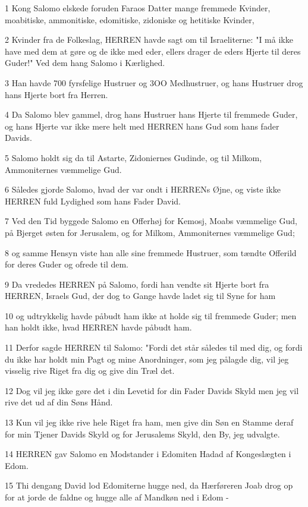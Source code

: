 \par 1 Kong Salomo elskede foruden Faraos Datter mange fremmede Kvinder, moabitiske, ammonitiske, edomitiske, zidoniske og hetitiske Kvinder,
\par 2 Kvinder fra de Folkeslag, HERREN havde sagt om til Israeliterne: "I må ikke have med dem at gøre og de ikke med eder, ellers drager de eders Hjerte til deres Guder!" Ved dem hang Salomo i Kærlighed.
\par 3 Han havde 700 fyrsfelige Hustruer og 3OO Medhustruer, og hans Hustruer drog hans Hjerte bort fra Herren.
\par 4 Da Salomo blev gammel, drog hans Hustruer hans Hjerte til fremmede Guder, og hans Hjerte var ikke mere helt med HERREN hans Gud som hans fader Davids.
\par 5 Salomo holdt sig da til Astarte, Zidoniernes Gudinde, og til Milkom, Ammoniternes væmmelige Gud.
\par 6 Således gjorde Salomo, hvad der var ondt i HERRENs Øjne, og viste ikke HERREN fuld Lydighed som hans Fader David.
\par 7 Ved den Tid byggede Salomo en Offerhøj for Kemosj, Moabs væmmelige Gud, på Bjerget østen for Jerusalem, og for Milkom, Ammoniternes væmmelige Gud;
\par 8 og samme Hensyn viste han alle sine fremmede Hustruer, som tændte Offerild for deres Guder og ofrede til dem.
\par 9 Da vrededes HERREN på Salomo, fordi han vendte sit Hjerte bort fra HERREN, Israels Gud, der dog to Gange havde ladet sig til Syne for ham
\par 10 og udtrykkelig havde påbudt ham ikke at holde sig til fremmede Guder; men han holdt ikke, hvad HERREN havde påbudt ham.
\par 11 Derfor sagde HERREN til Salomo: "Fordi det står således til med dig, og fordi du ikke har holdt min Pagt og mine Anordninger, som jeg pålagde dig, vil jeg visselig rive Riget fra dig og give din Træl det.
\par 12 Dog vil jeg ikke gøre det i din Levetid for din Fader Davids Skyld men jeg vil rive det ud af din Søns Hånd.
\par 13 Kun vil jeg ikke rive hele Riget fra ham, men give din Søn en Stamme deraf for min Tjener Davids Skyld og for Jerusalems Skyld, den By, jeg udvalgte.
\par 14 HERREN gav Salomo en Modstander i Edomiten Hadad af Kongeslægten i Edom.
\par 15 Thi dengang David lod Edomiterne hugge ned, da Hærføreren Joab drog op for at jorde de faldne og hugge alle af Mandkøn ned i Edom -
